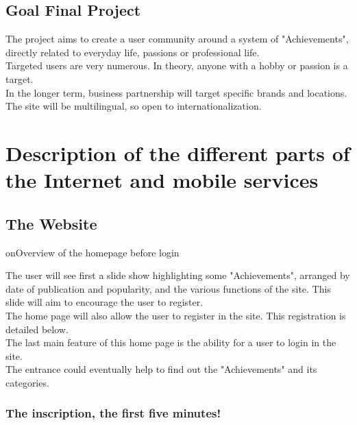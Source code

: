 \documentclass {life-en}
\begin{document}
\section{Goal Final Project}

The project aims to create a user community around a system of "Achievements", directly related to everyday life, passions or professional life.\\

Targeted users are very numerous. In theory, anyone with a hobby or passion is a target.\\

In the longer term, business partnership will target specific brands and locations.\\

The site will be multilingual, so open to internationalization.


\chapter{Description of the different parts of the Internet and mobile services}

\section{The Website}

\subsecti on{Overview of the homepage before login}

The user will see first a slide show highlighting some "Achievements", arranged by date of publication and popularity, and the various functions of the site. This slide will aim to encourage the user to register.\\

The home page will also allow the user to register in the site. This registration is detailed below.\\

The last main feature of this home page is the ability for a user to login in the site.\\

The entrance could eventually help to find out the "Achievements" and its categories.

\newpage

\subsection{The inscription, the first five minutes!}
\end{document}
